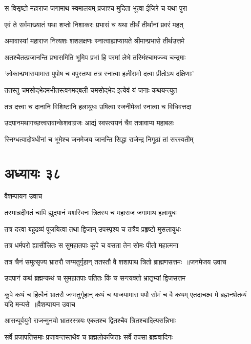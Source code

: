 \twolineshloka
{स विसृष्टो महाराज जगामाथ स्वमालयम्}
{प्रजाश्च मुदिता भूत्वा ईजिरे च यथा पुरा}


\twolineshloka
{एवं ते सर्वमाख्यातं यथा शप्तो निशाकरः}
{प्रभासं च यथा तीर्थं तीर्थानां प्रवरं महत्}


\twolineshloka
{अमावास्यां महाराज नित्यशः शशलक्षणः}
{स्नात्वाह्याप्यायते श्रीमान्प्रभासे तीर्थउत्तमे}


\twolineshloka
{अतश्चैतत्प्रजानन्ति प्रभासमिति भूमिप}
{प्रभां हि परमां लेभे तस्मिंश्चामज्ज्य चन्द्रमाः}


\twolineshloka
{`लोकान्प्रभासयामास पुपोष च वपुस्तथा}
{तत्र स्नात्वा हलीरामो दत्वा प्रीतोऽथ दक्षिणाः'}


\twolineshloka
{ततस्तु चमसोद्भेदमभीतस्त्वगमद्बली}
{चमसोद्भेद इत्येवं यं जनाः कथयन्त्युत}


\twolineshloka
{तत्र दत्त्वा च दानानि विशिष्टानि हलायुधः}
{उषित्वा रजनीमेकां स्नात्वा च विधिवत्तदा}


\twolineshloka
{उदपानमथागच्छत्त्वरावान्केशवाग्रजः}
{आद्यं स्वस्त्ययनं चैव तत्रावाप्य महाबलः}


\twolineshloka
{स्निग्धत्वादोषधीनां च भूमेश्च जनमेजय}
{जानन्ति सिद्धा राजेन्द्र निगूढां तां सरस्वतीम्}


\chapter{अध्यायः ३८}
\twolineshloka
{वैशम्पायन उवाच}
{}


\twolineshloka
{तस्मान्नदीगतं चापि ह्युदपानं यशस्विनः}
{त्रितस्य च महाराज जगामाथ हलायुधः}


\twolineshloka
{तत्र दत्त्वा बहुद्रव्यं पूजयित्वा तथा द्विजान्}
{उपस्पृश्य च तत्रैव प्रहृष्टो मुसलायुधः}


\twolineshloka
{तत्र धर्मपरो ह्यासीत्त्रितः स सुमहातपाः}
{कूपे च वसता तेन सोमः पीतो महात्मना}


\threelineshloka
{तत्र चैनं समुत्सृज्य भ्रातरौ जग्मतुर्गृहान्}
{ततस्तौ वै शशापाथ त्रितो ब्राह्मणसत्तमः ॥जनमेजय उवाच}
{}


\twolineshloka
{उदपानं कथं ब्रह्मन्कथं च सुमहातपाः}
{पतितः किं च सन्त्यक्तो भ्रातृभ्यां द्विजसत्तम}


\fourlineindentedshloka
{कूपे कथं च हित्वैनं भ्रातरौ जग्मतुर्गृहान्}
{कथं च याजयामास पपौ सोमं च वै कथम्}
{एतदाचक्ष्व मे ब्रह्मन्श्रोतव्यं यदि मन्यसे ॥वैशम्पायन उवाच}
{}


\twolineshloka
{आसन्पूर्वयुगे राजन्मुनयो भ्रातरस्त्रयः}
{एकतश्च द्वितश्चैव त्रितश्चादित्यसन्निभाः}


\twolineshloka
{सर्वे प्रजापतिसमाः प्रजावन्तस्तथैव च}
{ब्रह्मलोकजिताः सर्वे तपसा ब्रह्मवादिनः}


